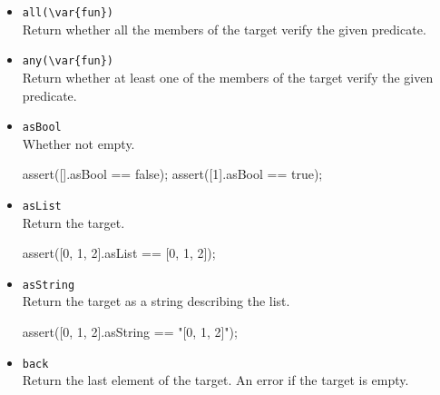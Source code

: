\begin{itemize}
\item \lstinline|all(\var{fun})|\\
Return whether all the members of the target verify the given
predicate.


\item \lstinline|any(\var{fun})|\\
Return whether at least one of the members of the target verify the
given predicate.


\item \lstinline|asBool|\\
  Whether not empty.
\begin{urbiscript}[firstnumber=last]
assert([].asBool == false);
assert([1].asBool == true);
\end{urbiscript}

\item \lstinline|asList|\\
Return the target.

\begin{urbiscript}[firstnumber=last]
assert([0, 1, 2].asList == [0, 1, 2]);
\end{urbiscript}

\item \lstinline|asString|\\
Return the target as a string describing the list.

\begin{urbiscript}[firstnumber=last]
assert([0, 1, 2].asString == "[0, 1, 2]");
\end{urbiscript}

\item \lstinline|back|\\
Return the last element of the target. An error if the target is empty.


\end{itemize}
